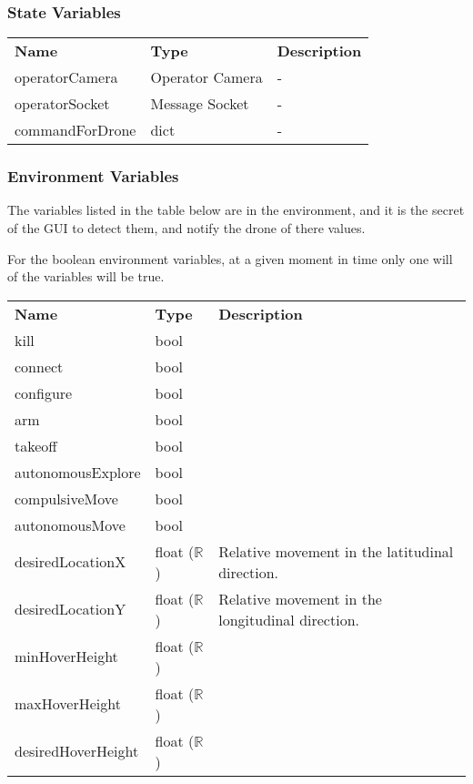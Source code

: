 \documentclass[12pt, titlepage]{article}
\begin{document}
\subsubsection{State Variables}
\begin{center}
\begin{tabular}{p{4 cm} p{4cm} p{5cm} }
\hline
\textbf{Name} & \textbf{Type} & \textbf{Description}  \\
operatorCamera & Operator Camera & - \\
operatorSocket & Message Socket & - \\
commandForDrone & dict & - \\
\hline
\hline
\end{tabular}
\end{center}
\subsubsection{Environment Variables}
The variables listed in the table below are in the environment, and it is the secret of the GUI to detect them, and notify the drone of there values. 

For the boolean environment variables, at a given moment in time only one will of the variables will be true.
\begin{center}
\begin{tabular}{p{4 cm} p{4cm} p{5cm} }
\hline
\textbf{Name} & \textbf{Type} & \textbf{Description}  \\
kill & bool &  \\
connect & bool &  \\
configure & bool &  \\
arm & bool &  \\
takeoff & bool &  \\
autonomousExplore & bool &  \\
compulsiveMove & bool &  \\
autonomousMove & bool &  \\
desiredLocationX & float ($\mathbb{R}$) & Relative movement in the latitudinal direction. \\
desiredLocationY & float ($\mathbb{R}$) & Relative movement in the longitudinal direction. \\
minHoverHeight & float ($\mathbb{R}$) &  \\
maxHoverHeight & float ($\mathbb{R}$) &  \\
desiredHoverHeight & float ($\mathbb{R}$) &  \\
\hline
\hline
\end{tabular}
\end{center}
\end{document}
